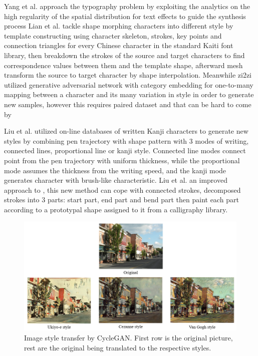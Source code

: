 \documentclass[12pt]{report}
\begin{document}
Yang et al.\cite{awesome-typography} approach the typography problem by exploiting the analytics on the
high regularity of the spatial distribution for text effects to guide the synthesis
process
Lian et al.\cite{automatic-morphing} tackle shape morphing characters into different style by template
constructing using character skeleton, strokes, key points and connection triangles
for every Chinese character in the standard Kaiti font library, then breakdown the
strokes of the source and target characters to find correspondence values between
them and the template shape, afterward mesh transform the source to target character
by shape interpolation.
Meanwhile zi2zi \cite{zi2zi} utilized generative adversarial network with category
embedding for one-to-many mapping between a character and its many variation in
style in order to generate new samples, however this requires paired dataset and that
can be hard to come by

Liu et al.\cite{online-kanji} utilized on-line databases of written Kanji characters to generate new styles by combining pen trajectory with shape pattern with 3 modes of writing, connected lines, proportional line or kanji style. Connected line modes connect point from the pen trajectory with uniform thickness, while the proportional mode assumes the thickness from the writing speed, and the kanji mode generates character with brush-like characteristic.
Liu et al.\cite{online-kanji-2} an improved approach to \cite{online-kanji}, this new method can cope with connected strokes, decomposed strokes into 3 parts: start part, end part and bend part then paint each part according to a prototypal shape assigned to it from a calligraphy library.

\begin{figure}[h]
	\centering
	\includegraphics[scale=0.65]{style-transfer}
	\caption{Image style transfer by CycleGAN. First row is the original picture, rest are the original being translated to the respective styles.}
	\label{fig:style-transfer}
\end{figure}
\end{document}
